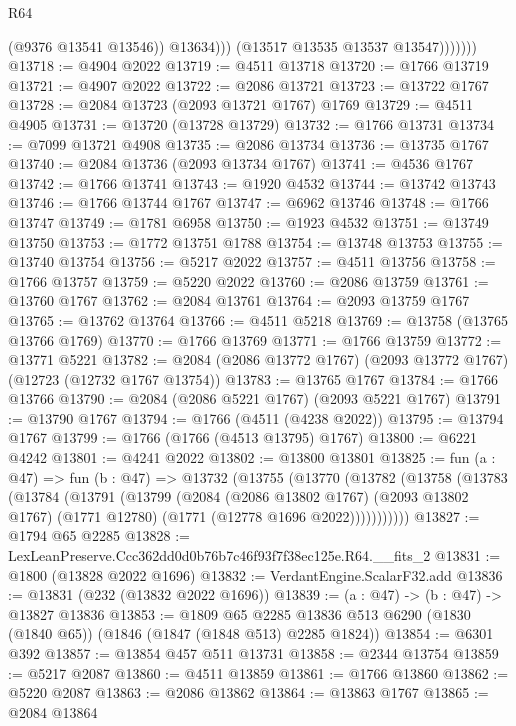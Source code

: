 \begin{lexlean}{R64}
\begin{coremodule}
                        (@9376 @13541 @13546))
                      @13634)))
                (@13517 @13535 @13537 @13547)))))))
@13718 := @4904 @2022
@13719 := @4511 @13718
@13720 := @1766 @13719
@13721 := @4907 @2022
@13722 := @2086 @13721
@13723 := @13722 @1767
@13728 := @2084 @13723 (@2093 @13721 @1767) @1769
@13729 := @4511 @4905
@13731 := @13720 (@13728 @13729)
@13732 := @1766 @13731
@13734 := @7099 @13721 @4908
@13735 := @2086 @13734
@13736 := @13735 @1767
@13740 := @2084 @13736 (@2093 @13734 @1767)
@13741 := @4536 @1767
@13742 := @1766 @13741
@13743 := @1920 @4532
@13744 := @13742 @13743
@13746 := @1766 @13744 @1767
@13747 := @6962 @13746
@13748 := @1766 @13747
@13749 := @1781 @6958
@13750 := @1923 @4532
@13751 := @13749 @13750
@13753 := @1772 @13751 @1788
@13754 := @13748 @13753
@13755 := @13740 @13754
@13756 := @5217 @2022
@13757 := @4511 @13756
@13758 := @1766 @13757
@13759 := @5220 @2022
@13760 := @2086 @13759
@13761 := @13760 @1767
@13762 := @2084 @13761
@13764 := @2093 @13759 @1767
@13765 := @13762 @13764
@13766 := @4511 @5218
@13769 := @13758 (@13765 @13766 @1769)
@13770 := @1766 @13769
@13771 := @1766 @13759
@13772 := @13771 @5221
@13782 := @2084 (@2086 @13772 @1767) (@2093 @13772 @1767) (@12723 (@12732 @1767 @13754))
@13783 := @13765 @1767
@13784 := @1766 @13766
@13790 := @2084 (@2086 @5221 @1767) (@2093 @5221 @1767)
@13791 := @13790 @1767
@13794 := @1766 (@4511 (@4238 @2022))
@13795 := @13794 @1767
@13799 := @1766 (@1766 (@4513 @13795) @1767)
@13800 := @6221 @4242
@13801 := @4241 @2022
@13802 := @13800 @13801
@13825 := fun (a : @47) =>
  fun (b : @47) =>
  @13732
    (@13755
      (@13770
        (@13782
          (@13758
            (@13783
              (@13784
                (@13791
                  (@13799
                    (@2084
                      (@2086 @13802 @1767)
                      (@2093 @13802 @1767)
                      (@1771 @12780)
                      (@1771 (@12778 @1696 @2022)))))))))))
@13827 := @1794 @65 @2285
@13828 := LexLeanPreserve.Ccc362dd0d0b76b7c46f93f7f38ec125e.R64.__fits_2
@13831 := @1800 (@13828 @2022 @1696)
@13832 := VerdantEngine.ScalarF32.add
@13836 := @13831 (@232 (@13832 @2022 @1696))
@13839 := (a : @47) -> (b : @47) -> @13827 @13836
@13853 := @1809
    @65
    @2285
    @13836
    @513
    @6290
    (@1830 (@1840 @65))
    (@1846 (@1847 (@1848 @513) @2285 @1824))
@13854 := @6301 @392
@13857 := @13854 @457 @511 @13731
@13858 := @2344 @13754
@13859 := @5217 @2087
@13860 := @4511 @13859
@13861 := @1766 @13860
@13862 := @5220 @2087
@13863 := @2086 @13862
@13864 := @13863 @1767
@13865 := @2084 @13864

\end{coremodule}
\end{lexlean}
